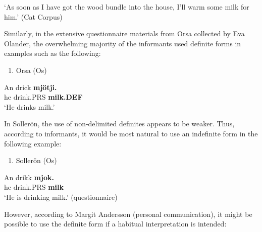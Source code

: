  ‘As soon as I have got the wood bundle into the house, I’ll warm some milk for him.’ (Cat Corpus)
\z


Similarly, in the extensive questionnaire materials from Orsa collected by Eva Olander, the overwhelming majority of the informants used definite forms in examples such as the following:

\begin{enumerate} %
\item 
Orsa (Os)

\end{enumerate} %
\ea\label{}
\gll An  drick  \textbf{mjötji.}\\


he  drink.PRS  \textbf{milk.DEF}\\ %


‘He drinks milk.’
\z


In Sollerön, the use of non-delimited definites appears to be weaker. Thus, according to informants, it would be most natural to use an indefinite form in the following example:

\begin{enumerate} %
\item 
Sollerön (Os) 

\end{enumerate} %
\ea\label{}
\gll An  drikk  \textbf{mjok.}\\


he  drink.PRS  \textbf{milk}\\ %


‘He is drinking milk.’ (questionnaire)
\z


However, according to Margit Andersson (personal communication), it might be possible to use the definite form if a habitual interpretation is intended:

